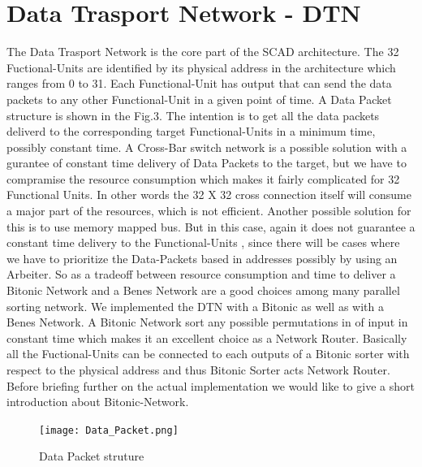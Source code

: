 \documentclass[adraft]{eptcs}
\begin{document}
	\section{Data Trasport Network - DTN}
		The Data Trasport Network is the core part of the SCAD architecture. The 32 Fuctional-Units are identified by its physical address in the architecture which ranges from 0 to 31. Each Functional-Unit has output 
		that can send the data packets to any other Functional-Unit in a given point of time. A Data Packet structure is shown in the Fig.3. The intention is to get all the data packets deliverd to the 
		corresponding target Functional-Units in a minimum time, possibly constant time. A Cross-Bar switch network is a possible solution with a gurantee of constant time delivery of Data Packets to the target,
		but we have to compramise the resource consumption which makes it fairly complicated for 32 Functional Units. In other words the 32 X 32 cross connection itself will consume a major part of the resources, 
		which is not efficient. Another possible solution for this is to use memory mapped bus. But in this case, again it does not guarantee a constant time delivery to the 
		Functional-Units , since there will be cases where we have to prioritize the Data-Packets based in addresses possibly by using an Arbeiter. So as a tradeoff between resource consumption and time to deliver
		a Bitonic Network and a Benes Network are a good choices among many parallel sorting network. We implemented the DTN with a Bitonic as well as with a Benes Network. 
		A Bitonic Network sort any possible permutations in of input in constant time which makes it an excellent choice as a Network Router.
		Basically all the Fuctional-Units can be connected to each outputs of a Bitonic sorter with respect to the physical address and thus Bitonic Sorter acts Network Router. Before briefing further on the actual implementation
		we would like to give a short introduction about Bitonic-Network.

			\begin{figure}[!ht]
				\texttt{[image: Data\_Packet.png]}
				\caption{Data Packet struture}
			\end{figure}
\end{document}
